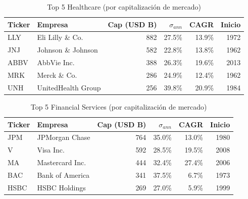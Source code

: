 \begin{table}[H]
  \centering
  \caption{Top 5 Healthcare (por capitalización de mercado)}
  \small
  \begin{tabular}{llrrrr}
    \toprule
    \textbf{Ticker} & \textbf{Empresa} & \textbf{Cap (USD B)}
                    & \textbf{$\sigma_{ann}$} & \textbf{CAGR} & \textbf{Inicio} \\
    \midrule
    LLY  & Eli Lilly \& Co.   & 882 & 27.5\% & 13.9\% & 1972 \\
    JNJ  & Johnson \& Johnson & 582 & 22.8\% & 13.8\% & 1962 \\
    ABBV & AbbVie Inc.        & 388 & 26.3\% & 19.6\% & 2013 \\
    MRK  & Merck \& Co.       & 286 & 24.9\% & 12.4\% & 1962 \\
    UNH  & UnitedHealth Group & 256 & 39.8\% & 20.9\% & 1984 \\
    \bottomrule
  \end{tabular}
\end{table}

\begin{table}[H]
  \centering
  \caption{Top 5 Financial Services (por capitalización de mercado)}
  \small
  \begin{tabular}{llrrrr}
    \toprule
    \textbf{Ticker} & \textbf{Empresa} & \textbf{Cap (USD B)}
                    & \textbf{$\sigma_{ann}$} & \textbf{CAGR} & \textbf{Inicio} \\
    \midrule
    JPM  & JPMorgan Chase  & 764 & 35.0\% & 13.0\% & 1980 \\
    V    & Visa Inc.       & 592 & 28.5\% & 19.5\% & 2008 \\
    MA   & Mastercard Inc. & 444 & 32.4\% & 27.4\% & 2006 \\
    BAC  & Bank of America & 341 & 37.5\% &  6.7\% & 1973 \\
    HSBC & HSBC Holdings   & 269 & 27.0\% &  5.9\% & 1999 \\
    \bottomrule
  \end{tabular}
\end{table}

